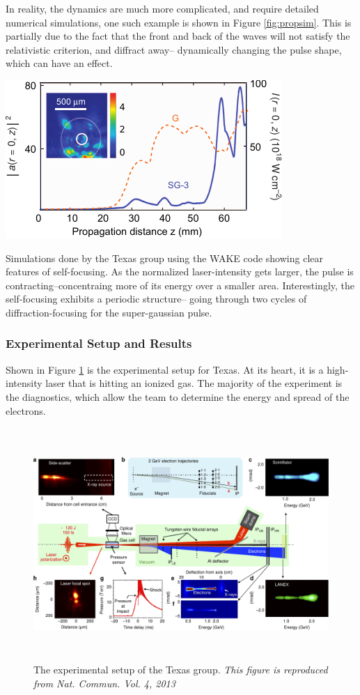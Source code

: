 \documentclass[12pt,letter]{article}
\begin{document}
In reality, the dynamics are much more complicated, and require detailed
numerical simulations, one such example is shown in Figure
\ref{fig:propsim}\cite{Wang2013}. This is partially due to the fact that the
front and back of the waves will not satisfy the relativistic criterion, and
diffract away-- dynamically changing the pulse shape, which can have an effect.
\begin{marginfigure}
	\includegraphics[width=\marginparwidth]{../figures/wakesimulation.pdf}
    \caption{Simulations done by the Texas group using the WAKE
        code showing clear features of self-focusing.\cite{Wang2013} As the
        normalized laser-intensity gets larger, the pulse is
        contracting--concentraing more of its energy over a smaller area.
        Interestingly, the self-focusing exhibits a periodic structure-- going
        through two cycles of diffraction-focusing for the super-gaussian
    pulse.\label{fig:propsim}}
\end{marginfigure}

\subsubsection{Experimental Setup and Results}
Shown in Figure \ref{fig:experTexas} is the experimental setup for Texas. At
its heart, it is a high-intensity laser that is hitting an ionized gas. The
majority of the experiment is the diagnostics, which allow the team to determine
the energy and spread of the electrons.
\begin{figure}[b!]
	\includegraphics[width=500pt,height=250pt]{../figures/texasexplayout.pdf}
    \caption{The experimental setup of the Texas group.\cite{Wang2013} \em{This
            figure is reproduced from Nat. Commun. Vol. 4, 2013
            \label{fig:experTexas} 
    }}
\end{figure}
\end{document}
